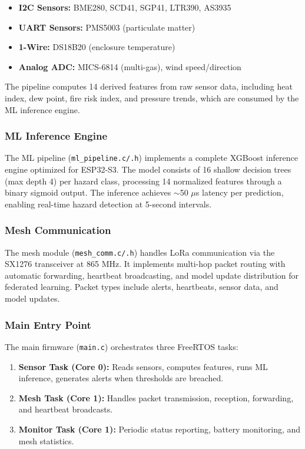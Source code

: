 \documentclass[conference]{IEEEtran}
\begin{document}
\begin{itemize}
    \item \textbf{I2C Sensors:} BME280, SCD41, SGP41, LTR390, AS3935
    \item \textbf{UART Sensors:} PMS5003 (particulate matter)
    \item \textbf{1-Wire:} DS18B20 (enclosure temperature)
    \item \textbf{Analog ADC:} MICS-6814 (multi-gas), wind speed/direction
\end{itemize}

The pipeline computes 14 derived features from raw sensor data, including
heat index, dew point, fire risk index, and pressure trends, which are
consumed by the ML inference engine.

\subsubsection{ML Inference Engine}
The ML pipeline (\texttt{ml\_pipeline.c/.h}) implements a complete XGBoost
inference engine optimized for ESP32-S3. The model consists of 16 shallow
decision trees (max depth 4) per hazard class, processing 14 normalized
features through a binary sigmoid output. The inference achieves
$\sim$50 $\mu$s latency per prediction, enabling real-time hazard detection
at 5-second intervals.

\subsubsection{Mesh Communication}
The mesh module (\texttt{mesh\_comm.c/.h}) handles LoRa communication via
the SX1276 transceiver at 865 MHz. It implements multi-hop packet routing
with automatic forwarding, heartbeat broadcasting, and model update
distribution for federated learning. Packet types include alerts,
heartbeats, sensor data, and model updates.

\subsubsection{Main Entry Point}
The main firmware (\texttt{main.c}) orchestrates three FreeRTOS tasks:
\begin{enumerate}
    \item \textbf{Sensor Task (Core 0):} Reads sensors, computes features,
    runs ML inference, generates alerts when thresholds are breached.
    \item \textbf{Mesh Task (Core 1):} Handles packet transmission,
    reception, forwarding, and heartbeat broadcasts.
    \item \textbf{Monitor Task (Core 1):} Periodic status reporting,
    battery monitoring, and mesh statistics.
\end{enumerate}
\end{document}
